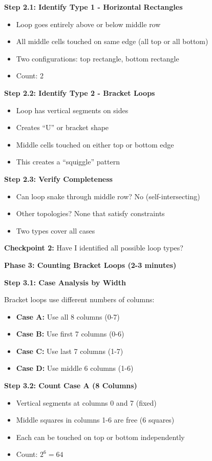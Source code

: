 \documentclass[12pt]{article}
\begin{document}
\begin{solutionbox}
\textbf{Step 2.1: Identify Type 1 - Horizontal Rectangles}
\begin{itemize}
    \item Loop goes entirely above or below middle row
    \item All middle cells touched on same edge (all top or all bottom)
    \item Two configurations: top rectangle, bottom rectangle
    \item Count: 2
\end{itemize}

\textbf{Step 2.2: Identify Type 2 - Bracket Loops}
\begin{itemize}
    \item Loop has vertical segments on sides
    \item Creates ``U'' or bracket shape
    \item Middle cells touched on either top or bottom edge
    \item This creates a ``squiggle'' pattern
\end{itemize}

\textbf{Step 2.3: Verify Completeness}
\begin{itemize}
    \item Can loop snake through middle row? No (self-intersecting)
    \item Other topologies? None that satisfy constraints
    \item Two types cover all cases
\end{itemize}

\textbf{Checkpoint 2:} Have I identified all possible loop types?

\textbf{Phase 3: Counting Bracket Loops (2-3 minutes)}

\textbf{Step 3.1: Case Analysis by Width}

Bracket loops use different numbers of columns:
\begin{itemize}
    \item \textbf{Case A:} Use all 8 columns (0-7)
    \item \textbf{Case B:} Use first 7 columns (0-6)
    \item \textbf{Case C:} Use last 7 columns (1-7)
    \item \textbf{Case D:} Use middle 6 columns (1-6)
\end{itemize}

\textbf{Step 3.2: Count Case A (8 Columns)}
\begin{itemize}
    \item Vertical segments at columns 0 and 7 (fixed)
    \item Middle squares in columns 1-6 are free (6 squares)
    \item Each can be touched on top or bottom independently
    \item Count: $2^6 = 64$
\end{itemize}


\end{solutionbox}
\end{document}
